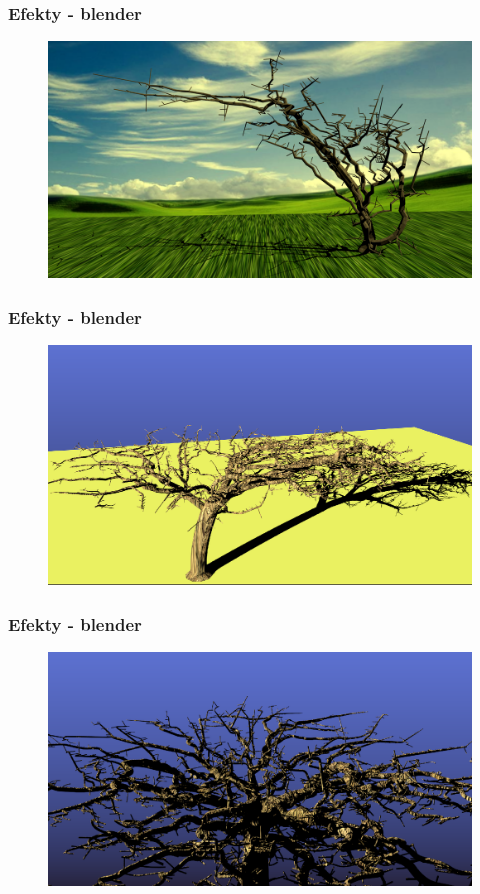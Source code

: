 \documentclass[blue,table]{beamer}
\begin{document}
\begin{frame}\frametitle{Efekty - blender}
\begin{figure}
\includegraphics[scale=0.25]{img/blender/blender6.png} 
\end{figure}
\end{frame}

\begin{frame}\frametitle{Efekty - blender}
\begin{figure}
\includegraphics[scale=0.3]{img/blender/blender7.png} 
\end{figure}
\end{frame}

\begin{frame}\frametitle{Efekty - blender}
\begin{figure}
\includegraphics[scale=0.3]{img/blender/blender8.png} 
\end{figure}
\end{frame}
\end{document}
